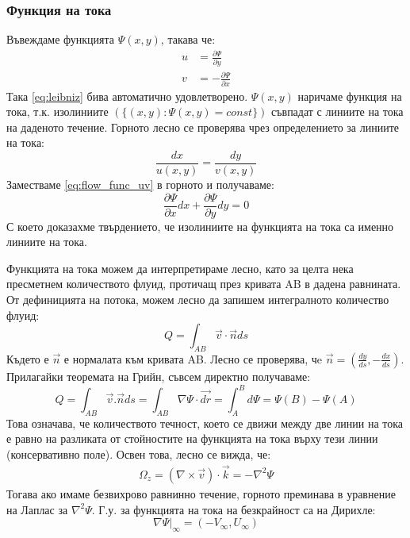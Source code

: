 \subsubsection{Функция на тока}
Въвеждаме функцията $\Psi(x,y)$, такава че:
\begin{align}
	\label{eq:flow_func_uv}
	u & = \frac{\partial \Psi}{\partial y}            \\
	v & = -\frac{\partial \Psi}{\partial x} \nonumber
\end{align}
Така \autoref{eq:leibniz} бива автоматично удовлетворено. $\Psi(x,y)$ наричаме функция на тока, т.к. изолиниите $\left(\{(x,y): \Psi(x,y) = const\}\right)$ съвпадат с линиите на тока на даденото течение.
Горното лесно се проверява чрез определението за линиите на тока:
\begin{equation*}
	\frac{dx}{u(x,y)} = \frac{dy}{v(x,y)}
\end{equation*}
Заместваме \autoref{eq:flow_func_uv} в горното и получаваме:
\begin{equation*}
	\frac{\partial \Psi}{\partial x} d x + \frac{\partial \Psi}{\partial y} d y = 0
\end{equation*}
С което доказахме твърдението, че изолиниите на функцията на тока са именно линиите на тока.

Функцията на тока можем да интерпретираме лесно, като за целта нека пресметнем количеството флуид, протичащ през кривата AB в дадена равнината. От дефиницията на потока, можем лесно да запишем интегралното количество флуид:
\begin{equation*}
	Q = \int_{AB} \vec{v} \cdot \vec{n} ds
\end{equation*}
Където е $\vec{n}$ е нормалата към кривата AB. Лесно се проверява, чe $\vec{n} = (\frac{dy}{ds}, -\frac{d x}{d s})$. Прилагайки теоремата на Грийн, съвсем директно получаваме:
\begin{equation}
	Q = \int_{AB} \vec{v}.\vec{n} ds = \int_{AB} \nabla \Psi \cdot \vec{dr} = \int_{A}^{B} d \Psi = \Psi(B) - \Psi(A)
\end{equation}
Това означава, че количеството течност, което се движи между две линии на тока е равно на разликата от стойностите на функцията на тока върху тези линии (консервативно поле).
Освен това, лесно се вижда, че:
\begin{align*}
	\Omega_z = (\nabla \times \vec{v}) \cdot \vec{k} = - \nabla^2 \Psi
\end{align*}
Тогава ако имаме безвихрово равнинно течение, горното преминава в уравнение на Лаплас за $\nabla^2 \Psi$.
Г.у. за функцията на тока на безкрайност са на Дирихле:
\begin{equation*}
	\nabla \Psi \big|_\infty = (-V_\infty, U_\infty)
\end{equation*}

